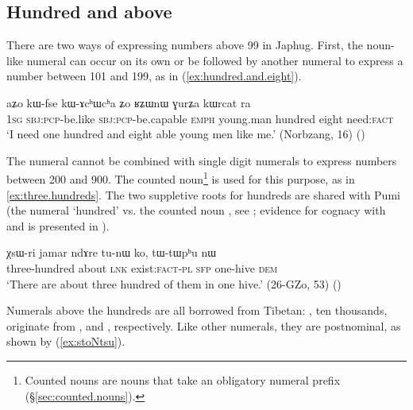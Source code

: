 \subsection{Hundred and above} \label{sec.hundred.plus}
There are two ways of expressing numbers above 99 in Japhug. First, the noun-like numeral  can occur on its own or be followed by another numeral to express a number between 101 and 199, as in (\ref{ex:hundred.and.eight}).

\begin{exe}
\ex \label{ex:hundred.and.eight}
\gll aʑo kɯ-fse kɯ-ɤcʰɯcʰa ʑo ʁʑɯnɯ ɣurʑa kɯrcat ra\\
\textsc{1sg} \textsc{sbj}:\textsc{pcp}-be.like  \textsc{sbj}:\textsc{pcp}-be.capable \textsc{emph} young.man hundred eight need:\textsc{fact} \\
\glt `I need one hundred and eight able young men like me.' (Norbzang, 16)
()
\end{exe}

The numeral  cannot be combined with single digit numerals to express numbers between 200 and 900. The counted noun\footnote{Counted nouns are nouns that take an obligatory numeral prefix (§\ref{sec:counted.nouns}). }  is used for this purpose, as in \ref{ex:three.hundreds}. The two suppletive roots for hundreds are shared with Pumi (the numeral  `hundred' vs. the counted noun , see \citealt[101]{daudey14grammar}; evidence for cognacy with  and  is presented in \citealt{jacques17num}).

\begin{exe}
\ex \label{ex:three.hundreds}
\gll χsɯ-ri jamar ndɤre tu-nɯ ko, tɯ-tɯpʰu nɯ \\
three-hundred about \textsc{lnk} exist:\textsc{fact}-\textsc{pl} \textsc{sfp} one-hive \textsc{dem} \\
\glt `There are about three hundred of them in one hive.' (26-GZo, 53)
()
\end{exe}
 
Numerals above the hundreds are all borrowed from Tibetan: ,  {ten thousands},  originate from ,  and , respectively.  Like other numerals, they are postnominal, as shown by (\ref{ex:stoNtsu}).


